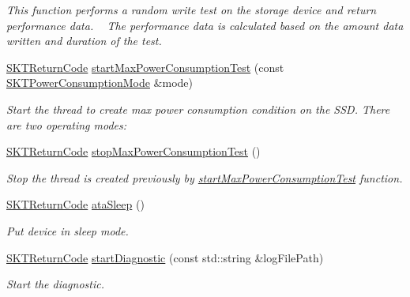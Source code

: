 \begin{DoxyCompactItemize}
\begin{DoxyCompactList}\small\item\em This function performs a random write test on the storage device and return performance data. ~\newline
The performance data is calculated based on the amount data written and duration of the test. \end{DoxyCompactList}\item 
\mbox{\hyperlink{_storage_kit_test_delegate_8h_a143844aea21c1ac420c1d0307a69deb7}{S\+K\+T\+Return\+Code}} \mbox{\hyperlink{class_s_k_t_test_delegate_a0db3d4f4d578063fdd4f76878a380c29}{start\+Max\+Power\+Consumption\+Test}} (const \mbox{\hyperlink{_storage_kit_test_delegate_8h_a0bde7719e6307ceed4a51107ed3de2ef}{S\+K\+T\+Power\+Consumption\+Mode}} \&mode)
\begin{DoxyCompactList}\small\item\em Start the thread to create max power consumption condition on the S\+SD. There are two operating modes\+: \end{DoxyCompactList}\item 
\mbox{\hyperlink{_storage_kit_test_delegate_8h_a143844aea21c1ac420c1d0307a69deb7}{S\+K\+T\+Return\+Code}} \mbox{\hyperlink{class_s_k_t_test_delegate_a022692ef371a3aa9a24e19b5a5e129c7}{stop\+Max\+Power\+Consumption\+Test}} ()
\begin{DoxyCompactList}\small\item\em Stop the thread is created previously by \mbox{\hyperlink{class_s_k_t_test_delegate_a0db3d4f4d578063fdd4f76878a380c29}{start\+Max\+Power\+Consumption\+Test}} function. \end{DoxyCompactList}\item 
\mbox{\hyperlink{_storage_kit_test_delegate_8h_a143844aea21c1ac420c1d0307a69deb7}{S\+K\+T\+Return\+Code}} \mbox{\hyperlink{class_s_k_t_test_delegate_a370b8ca0f86a90bc36101fd701b82609}{ata\+Sleep}} ()
\begin{DoxyCompactList}\small\item\em Put device in sleep mode. \end{DoxyCompactList}\item 
\mbox{\hyperlink{_storage_kit_test_delegate_8h_a143844aea21c1ac420c1d0307a69deb7}{S\+K\+T\+Return\+Code}} \mbox{\hyperlink{class_s_k_t_test_delegate_a90d0c168749430e20f9bee211adc20da}{start\+Diagnostic}} (const std\+::string \&log\+File\+Path)
\begin{DoxyCompactList}\small\item\em Start the diagnostic. ~\newline

\end{DoxyCompactList}
\end{DoxyCompactItemize}

